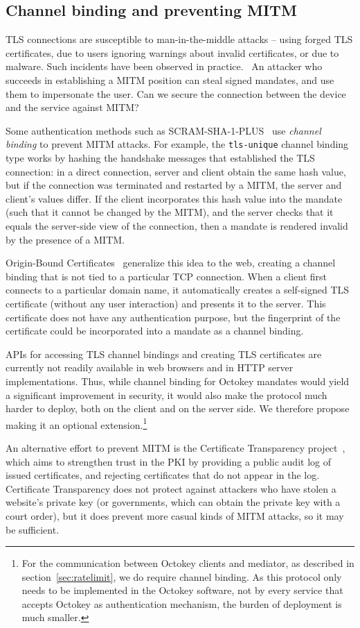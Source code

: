 \subsection{Channel binding and preventing MITM}\label{sec:channelbinding}

TLS connections are susceptible to man-in-the-middle attacks -- using forged TLS certificates, due
to users ignoring warnings about invalid certificates, or due to malware. Such incidents have been
observed in practice.~\cite{Huang14, Adkins11} An attacker who succeeds in establishing a MITM
position can steal signed mandates, and use them to impersonate the user. Can we secure the
connection between the device and the service against MITM?

Some authentication methods such as SCRAM-SHA-1-PLUS~\cite{SCRAM} use \emph{channel binding} to
prevent MITM attacks. For example, the \texttt{tls-unique} channel binding type works by hashing the
handshake messages that established the TLS connection: in a direct connection, server and client
obtain the same hash value, but if the connection was terminated and restarted by a MITM, the server
and client's values differ. If the client incorporates this hash value into the mandate (such that
it cannot be changed by the MITM), and the server checks that it equals the server-side view of the
connection, then a mandate is rendered invalid by the presence of a MITM.

Origin-Bound Certificates~\cite{Dietz12} generalize this idea to the web, creating a channel
binding that is not tied to a particular TCP connection. When a client first connects to a
particular domain name, it automatically creates a self-signed TLS certificate (without any user
interaction) and presents it to the server. This certificate does not have any authentication
purpose, but the fingerprint of the certificate could be incorporated into a mandate as a channel
binding.

APIs for accessing TLS channel bindings and creating TLS certificates are currently not readily
available in web browsers and in HTTP server implementations. Thus, while channel binding for
Octokey mandates would yield a significant improvement in security, it would also make the protocol
much harder to deploy, both on the client and on the server side. We therefore propose making it an
optional extension.\footnote{For the communication between Octokey clients and mediator, as
described in section~\ref{sec:ratelimit}, we do require channel binding. As this protocol only needs
to be implemented in the Octokey software, not by every service that accepts Octokey as
authentication mechanism, the burden of deployment is much smaller.}

An alternative effort to prevent MITM is the Certificate Transparency project~\cite{CertTrans},
which aims to strengthen trust in the PKI by providing a public audit log of issued certificates,
and rejecting certificates that do not appear in the log. Certificate Transparency does not protect
against attackers who have stolen a website's private key (or governments, which can obtain the
private key with a court order), but it does prevent more casual kinds of MITM attacks, so it may be
sufficient.
